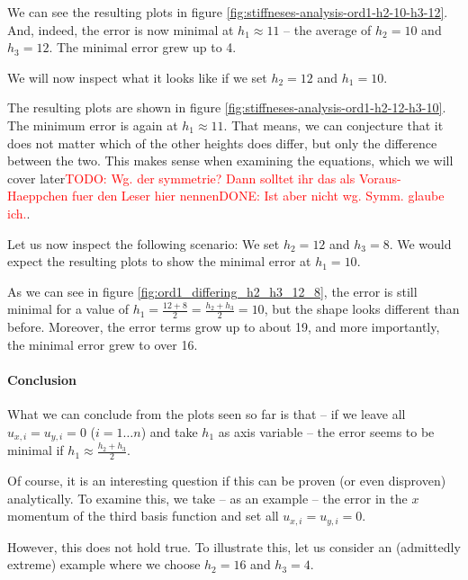 \documentclass{article}
\newcommand{\todo}[2][]{\textcolor{red}{TODO\ifthenelse{\equal{#1}{}}{}{[#1]}: #2}}
\newcommand{\done}[2][]{\textcolor{green!50!black}{DONE\ifthenelse{\equal{#1}{}}{}{[#1]}: #2}}
\begin{document}


We can see the resulting plots in figure \ref{fig:stiffneses-analysis-ord1-h2-10-h3-12}. And, indeed, the error is now minimal at $h_1\approx 11$ -- the average of $h_2=10$ and $h_3=12$. The minimal error grew up to 4.

We will now inspect what it looks like if we set $h_2=12$ and $h_1=10$.



The resulting plots are shown in figure \ref{fig:stiffneses-analysis-ord1-h2-12-h3-10}. The minimum error is again at $h_1\approx 11$. That means, we can conjecture that it does not matter which of the other heights does differ, but only the difference between the two. This makes sense when examining the equations, which we will cover later\todo{Wg. der symmetrie? Dann solltet ihr das als Voraus-Haeppchen fuer den Leser hier nennen\done{Ist aber nicht wg. Symm. glaube ich.}}.

Let us now inspect the following scenario: We set $h_2=12$ and $h_3=8$. We would expect the resulting plots to show the minimal error at $h_1=10$.



As we can see in figure \ref{fig:ord1_differing_h2_h3_12_8}, the error is still minimal for a value of $h_1=\frac{12+8}{2}=\frac{h_2+h_3}{2}=10$, but the shape looks different than before. Moreover, the error terms grow up to about 19, and more importantly, the minimal error grew to over 16.

\paragraph{Conclusion}


What we can conclude from the plots seen so far is that -- if we leave all $u_{x,i}=u_{y,i}=0$ ($i=1\dots n$) and take $h_1$ as axis variable -- the error seems to be minimal if $h_1\approx \frac{h_2+h_3}{2}$.

Of course, it is an interesting question if this can be proven (or even disproven) analytically. To examine this, we take -- as an example -- the error in the $x$ momentum of the third basis function and set all $u_{x,i}=u_{y,i}=0$.

However, this does not hold true.
To illustrate this, let us consider an (admittedly extreme) example where we choose $h_2=16$ and $h_3=4$.
\end{document}
